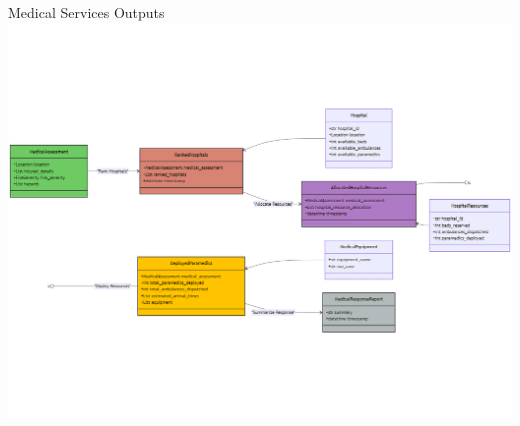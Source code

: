 \begin{frame}{Medical Services Outputs}
    \centering
    \includegraphics[width=\textwidth]{figures/MedicalServices_ClassDiagram.png}
\end{frame}